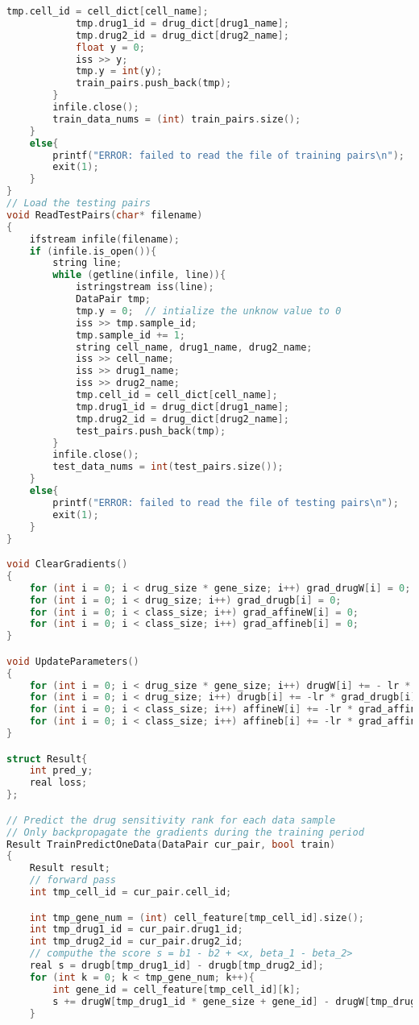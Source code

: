 \documentclass{article}
\begin{document}
\begin{lstlisting}[language=c++]
            tmp.cell_id = cell_dict[cell_name];
            tmp.drug1_id = drug_dict[drug1_name];
            tmp.drug2_id = drug_dict[drug2_name];
            float y = 0;
            iss >> y;
            tmp.y = int(y);
            train_pairs.push_back(tmp);
        }
        infile.close();
        train_data_nums = (int) train_pairs.size();
    }
    else{
        printf("ERROR: failed to read the file of training pairs\n");
        exit(1);
    }
}
// Load the testing pairs
void ReadTestPairs(char* filename)
{
    ifstream infile(filename);
    if (infile.is_open()){
        string line;
        while (getline(infile, line)){
            istringstream iss(line);
            DataPair tmp;
            tmp.y = 0;  // intialize the unknow value to 0
            iss >> tmp.sample_id;
            tmp.sample_id += 1;
            string cell_name, drug1_name, drug2_name;
            iss >> cell_name;
            iss >> drug1_name;
            iss >> drug2_name;
            tmp.cell_id = cell_dict[cell_name];
            tmp.drug1_id = drug_dict[drug1_name];
            tmp.drug2_id = drug_dict[drug2_name];
            test_pairs.push_back(tmp);
        }
        infile.close();
        test_data_nums = int(test_pairs.size());
    }
    else{
        printf("ERROR: failed to read the file of testing pairs\n");
        exit(1);
    }
}

void ClearGradients()
{
    for (int i = 0; i < drug_size * gene_size; i++) grad_drugW[i] = 0;
    for (int i = 0; i < drug_size; i++) grad_drugb[i] = 0;
    for (int i = 0; i < class_size; i++) grad_affineW[i] = 0;
    for (int i = 0; i < class_size; i++) grad_affineb[i] = 0;
}

void UpdateParameters()
{
    for (int i = 0; i < drug_size * gene_size; i++) drugW[i] += - lr * grad_drugW[i];
    for (int i = 0; i < drug_size; i++) drugb[i] += -lr * grad_drugb[i];
    for (int i = 0; i < class_size; i++) affineW[i] += -lr * grad_affineW[i];
    for (int i = 0; i < class_size; i++) affineb[i] += -lr * grad_affineb[i];
}

struct Result{
    int pred_y;
    real loss;
};

// Predict the drug sensitivity rank for each data sample
// Only backpropagate the gradients during the training period
Result TrainPredictOneData(DataPair cur_pair, bool train)
{
    Result result;
    // forward pass
    int tmp_cell_id = cur_pair.cell_id;

    int tmp_gene_num = (int) cell_feature[tmp_cell_id].size();
    int tmp_drug1_id = cur_pair.drug1_id;
    int tmp_drug2_id = cur_pair.drug2_id;
    // computhe the score s = b1 - b2 + <x, beta_1 - beta_2>
    real s = drugb[tmp_drug1_id] - drugb[tmp_drug2_id];
    for (int k = 0; k < tmp_gene_num; k++){
        int gene_id = cell_feature[tmp_cell_id][k];
        s += drugW[tmp_drug1_id * gene_size + gene_id] - drugW[tmp_drug2_id * gene_size + gene_id];
    }
    

\end{lstlisting}
\end{document}
